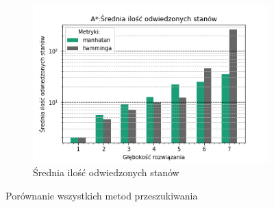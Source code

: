 \documentclass{classrep}
\begin{document}
\begin{figure}[H]
\begin{subfigure}[t]{0.45\textwidth}
        \includegraphics[width=\textwidth]{charts/ASTR_visited.png}
        \caption{Średnia ilość odwiedzonych stanów}
        \label{ASTR:visited}
    \end{subfigure}
    \caption{Porównanie wszystkich metod przeszukiwania}\label{fig:animals}
\end{figure}
\end{document}
